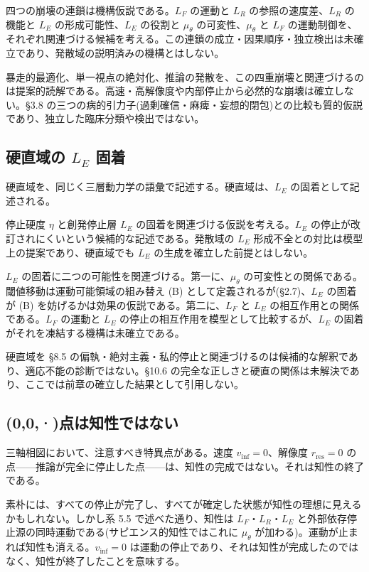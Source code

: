 四つの崩壊の連鎖は機構仮説である。$L_F$ の運動と $L_R$ の参照の速度差、$L_R$ の機能と $L_E$ の形成可能性、$L_E$ の役割と $\mu_\theta$ の可変性、$\mu_\theta$ と $L_F$ の運動制御を、それぞれ関連づける候補を考える。この連鎖の成立・因果順序・独立検出は未確立であり、発散域の説明済みの機構とはしない。

暴走的最適化、単一視点の絶対化、推論の発散を、この四重崩壊と関連づけるのは提案的読解である。高速・高解像度や内部停止から必然的な崩壊は確立しない。\S{}3.8 の三つの病的引力子(過剰確信・麻痺・妄想的閉包)との比較も質的仮説であり、独立した臨床分類や検出ではない。

\bigskip


\subsection{硬直域の $L_E$ 固着}


硬直域を、同じく三層動力学の語彙で記述する。硬直域は、$L_E$ の固着として記述される。

停止硬度 $\eta$ と創発停止層 $L_E$ の固着を関連づける仮説を考える。$L_E$ の停止が改訂されにくいという候補的な記述である。発散域の $L_E$ 形成不全との対比は模型上の提案であり、硬直域でも $L_E$ の生成を確立した前提とはしない。

$L_E$ の固着に二つの可能性を関連づける。第一に、$\mu_\theta$ の可変性との関係である。閾値移動は運動可能領域の組み替え (B) として定義されるが(\S{}2.7)、$L_E$ の固着が (B) を妨げるかは効果の仮説である。第二に、$L_F$ と $L_E$ の相互作用との関係である。$L_F$ の運動と $L_E$ の停止の相互作用を模型として比較するが、$L_E$ の固着がそれを凍結する機構は未確立である。

硬直域を \S{}8.5 の偏執・絶対主義・私的停止と関連づけるのは候補的な解釈であり、適応不能の診断ではない。\S{}10.6 の完全な正しさと硬直の関係は未解決であり、ここでは前章の確立した結果として引用しない。

\bigskip


\subsection{(0,0,·)点は知性ではない}


三軸相図において、注意すべき特異点がある。速度 $v_{\text{inf}} = 0$、解像度 $r_{\text{res}} = 0$ の点——推論が完全に停止した点——は、知性の完成ではない。それは知性の終了である。

素朴には、すべての停止が完了し、すべてが確定した状態が知性の理想に見えるかもしれない。しかし系 5.5 で述べた通り、知性は $L_F$・$L_R$・$L_E$ と外部依存停止源の同時運動である(サピエンス的知性ではこれに $\mu_\theta$ が加わる)。運動が止まれば知性も消える。$v_{\text{inf}} = 0$ は運動の停止であり、それは知性が完成したのではなく、知性が終了したことを意味する。

